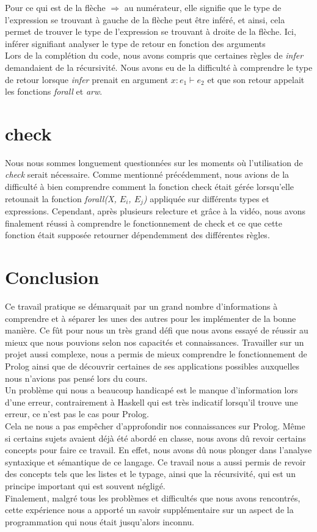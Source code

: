 \documentclass{article}
\begin{document}
Pour ce qui est de la flèche $\Rightarrow$ au numérateur, elle signifie que le type de l'expression se trouvant à gauche de la flèche peut être inféré, et ainsi, cela permet de trouver le type de l'expression se trouvant à droite de la flèche. Ici, inférer signifiant analyser le type de retour en fonction des arguments\\

Lors de la complétion du code, nous avons compris que certaines règles de \textit{infer} demandaient de la récursivité. Nous avons eu de la difficulté à comprendre le type de retour lorsque \textit{infer} prenait en argument $x:e_1 \vdash e_2$ et que son retour appelait les fonctions \textit{forall} et \textit{arw}.

\section{check}
Nous nous sommes longuement questionnées sur les moments où l'utilisation de \textit{check} serait nécessaire. Comme mentionné précédemment, nous avions de la difficulté à bien comprendre comment la fonction check était gérée lorsqu'elle retounait la fonction \textit{forall(X, $E_i$, $E_j$)} appliquée sur différents types et expressions. Cependant, après plusieurs relecture et grâce à la vidéo, nous avons finalement réussi à comprendre le fonctionnement de check et ce que cette fonction était supposée retourner dépendemment des différentes règles.

\section{Conclusion}
Ce travail pratique se démarquait par un grand nombre d'informations à comprendre et à séparer les unes des autres pour les implémenter de la bonne manière. Ce fût pour nous un très grand défi que nous avons essayé de réussir au mieux que nous pouvions selon nos capacités et connaissances. Travailler sur un projet aussi complexe, nous a permis de mieux comprendre le fonctionnement de Prolog ainsi que de découvrir certaines de ses applications possibles auxquelles nous n'avions pas pensé lors du cours.\\

Un problème qui nous a beaucoup handicapé est le manque d'information lors d'une erreur, contrairement à Haskell qui est très indicatif lorsqu'il trouve une erreur, ce n'est pas le cas pour Prolog.\\

Cela ne nous a pas empêcher d'approfondir nos connaissances sur Prolog. Même si certains sujets avaient déjà été abordé en classe, nous avons dû revoir certains concepts pour faire ce travail. En effet, nous avons dû nous plonger dans l'analyse syntaxique et sémantique de ce langage. Ce travail nous a aussi permis de revoir des concepts tels que les listes et le typage, ainsi que la récursivité, qui est un principe important qui est souvent négligé.\\

Finalement, malgré tous les problèmes et difficultés que nous avons rencontrés, cette expérience nous a apporté un savoir supplémentaire sur un aspect de la programmation qui nous était jusqu'alors inconnu.
\end{document}
